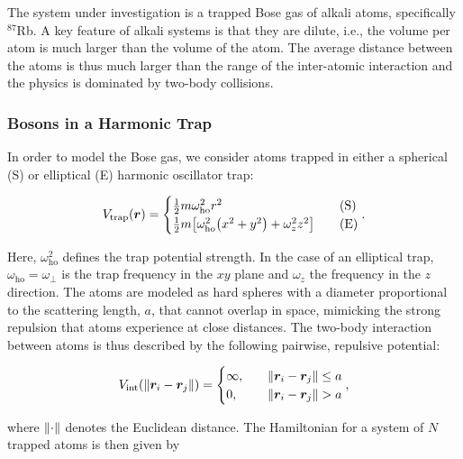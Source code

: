 The system under investigation is a trapped Bose gas of alkali atoms, specifically $^{87}$Rb. A key feature of alkali systems is that they are dilute, i.e., the volume per atom is much larger than the volume of the atom. The average distance between the atoms is thus much larger than the range of the inter-atomic interaction and the physics is dominated by two-body collisions. 

\subsubsection{Bosons in a Harmonic Trap}

In order to model the Bose gas, we consider atoms trapped in either a spherical (S) or elliptical (E) harmonic oscillator trap: 

\begin{equation}\label{eq:Vtrap}
    V_\mathrm{trap} \qty(\bm{r}) = 
    \begin{cases}
        \frac{1}{2} m \omega_\mathrm{ho}^2 r^2 \quad &\text{(S)}
        \\
        \frac{1}{2} m \qty[\omega_\mathrm{ho}^2 \qty(x^2 + y^2) + \omega_z^2 z^2] \quad &\text{(E)}
    \end{cases}.
\end{equation}

Here, $\omega_\mathrm{ho}^2$ defines the trap potential strength. In the case of an elliptical trap, $\omega_\mathrm{ho}=\omega_\perp$ is the trap frequency in the $xy$ plane and $\omega_z$ the frequency in the $z$ direction. The atoms are modeled as hard spheres with a diameter proportional to the scattering length, $a$, that cannot overlap in space, mimicking the strong repulsion that atoms experience at close distances. The two-body interaction between atoms is thus described by the following pairwise, repulsive potential:

\begin{equation}\label{eq:Vint}
    V_\mathrm{int} \qty(\norm{\bm{r}_i - \bm{r}_j}) = 
    \begin{cases}
        \infty, \quad &\norm{\bm{r}_i - \bm{r}_j} \leq a
        \\
        0, \quad &\norm{\bm{r}_i - \bm{r}_j} > a
    \end{cases},
\end{equation}

where $\norm{\cdot}$ denotes the Euclidean distance. The Hamiltonian for a system of $N$ trapped atoms is then given by

